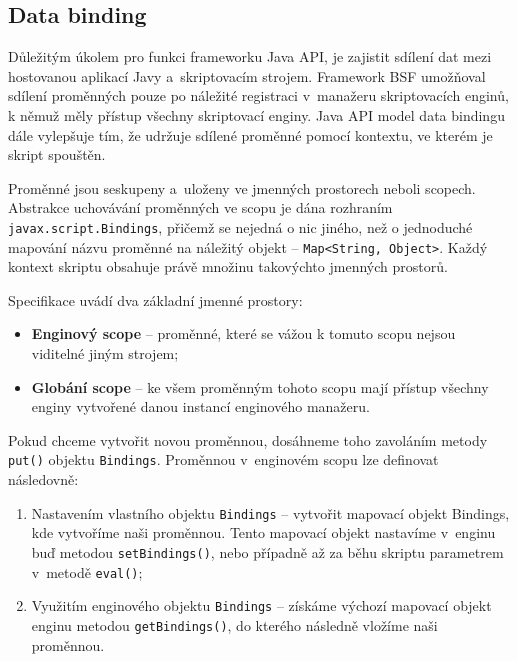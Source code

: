 \subsection{Data binding}
\label{Chapter.JavaScriptInJavaAnalysis.ScriptingJavaAPI.DataBinding}

Důležitým úkolem pro funkci frameworku Java API, je zajistit sdílení dat mezi hostovanou aplikací Javy a~skriptovacím strojem. Framework BSF umožňoval sdílení proměnných pouze po náležité registraci v~manažeru skriptovacích enginů, k němuž měly přístup všechny skriptovací enginy. Java API model data bindingu dále vylepšuje tím, že udržuje sdílené proměnné pomocí kontextu, ve kterém je skript spouštěn.

Proměnné jsou seskupeny a~uloženy ve jmenných prostorech neboli scopech. Abstrakce uchovávání proměnných ve scopu je dána rozhraním \texttt{javax.script.Bindings}, přičemž se nejedná o nic jiného, než o jednoduché mapování názvu proměnné na náležitý objekt -- \texttt{Map<String, Object>}. Každý kontext skriptu obsahuje právě množinu takovýchto jmenných prostorů.

\bigskip \noindent Specifikace uvádí dva základní jmenné prostory:

\begin{itemize}
  \item \textbf{Enginový scope} -- proměnné, které se vážou k tomuto scopu nejsou viditelné jiným strojem;
  \item \textbf{Globání scope} -- ke všem proměnným tohoto scopu mají přístup všechny enginy vytvořené danou instancí enginového manažeru.
\end{itemize}

Pokud chceme vytvořit novou proměnnou, dosáhneme toho zavoláním metody \texttt{put()} objektu \texttt{Bindings}. Proměnnou v~enginovém scopu lze definovat následovně:

\begin{enumerate}
  \item Nastavením vlastního objektu \texttt{Bindings} -- vytvořit mapovací objekt Bindings, kde vytvoříme naši proměnnou. Tento mapovací objekt nastavíme v~enginu buď metodou \texttt{setBindings()}, nebo případně až za běhu skriptu parametrem v~metodě \texttt{eval()};
  \item Využitím enginového objektu \texttt{Bindings} -- získáme výchozí mapovací objekt enginu metodou \texttt{getBindings()}, do kterého následně vložíme naši proměnnou.
\end{enumerate}

